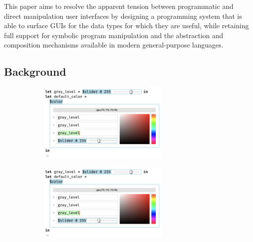 This paper aims to resolve the apparent tension between
programmatic and direct manipulation user interfaces by designing a programming system that
is able to surface GUIs for the data types for which
they are useful, while retaining full support for symbolic program manipulation
and the abstraction and composition mechanisms
available in modern general-purpose languages.

\subsection{Background}
\begin{figure}
  \begin{center}
    \begin{subfigure}[t]{0.5\textwidth}
      \centering
      \includegraphics[width=15pc]{slider-color-livelits.png}
    \end{subfigure}\begin{subfigure}[t]{0.5\textwidth}
      \centering
      \includegraphics[width=15pc]{slider-color-livelits.png}
    \end{subfigure}

\end{center}
\end{figure}
